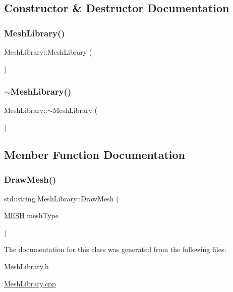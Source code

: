 \subsection{Constructor \& Destructor Documentation}
\mbox{\label{class_mesh_library_a263ef8b969d1b09956513de048488082}} 
\subsubsection{\texorpdfstring{MeshLibrary()}{MeshLibrary()}}
{\footnotesize\ttfamily Mesh\+Library\+::\+Mesh\+Library (\begin{DoxyParamCaption}{ }\end{DoxyParamCaption})}

\mbox{\label{class_mesh_library_ac6429ef7e113e35a9b1276ad362f81c7}} 
\subsubsection{\texorpdfstring{$\sim$MeshLibrary()}{~MeshLibrary()}}
{\footnotesize\ttfamily Mesh\+Library\+::$\sim$\+Mesh\+Library (\begin{DoxyParamCaption}{ }\end{DoxyParamCaption})}



\subsection{Member Function Documentation}
\mbox{\label{class_mesh_library_a1b79057329cc89dfa7616fe7aa48fe42}} 
\subsubsection{\texorpdfstring{DrawMesh()}{DrawMesh()}}
{\footnotesize\ttfamily std\+::string Mesh\+Library\+::\+Draw\+Mesh (\begin{DoxyParamCaption}\item[{\mbox{\hyperlink{_p_i_m_p_l_2_p_i_m_p_l_2_commons_8h_a7d8bc2c54c2771e646f020b8420adafc}{M\+E\+SH}}}]{mesh\+Type }\end{DoxyParamCaption})}



The documentation for this class was generated from the following files\+:\begin{DoxyCompactItemize}
\item 
\mbox{\hyperlink{_mesh_library_8h}{Mesh\+Library.\+h}}\item 
\mbox{\hyperlink{_mesh_library_8cpp}{Mesh\+Library.\+cpp}}\end{DoxyCompactItemize}
